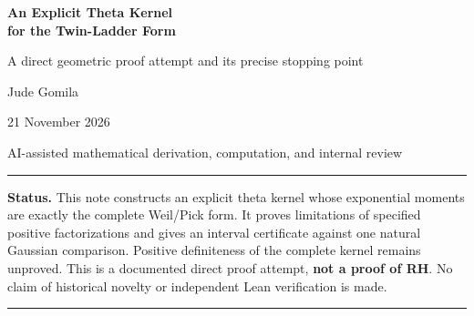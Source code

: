 \documentclass[11pt,letterpaper]{article}
\theoremstyle{remark}\newtheorem{remark}[theorem]{Remark}
\numberwithin{equation}{section}
\begin{document}
\begin{center}
{\LARGE\bfseries An Explicit Theta Kernel\\[0.2em]for the Twin-Ladder Form}\par
\vspace{0.4em}
{\large A direct geometric proof attempt and its precise stopping point}\par
\vspace{0.7em}
Jude Gomila\par
21 November 2026\par
{\small AI-assisted mathematical derivation, computation, and internal review}
\end{center}
\vspace{0.4em}\hrule\vspace{0.4em}
\textbf{Status.} This note constructs an explicit theta kernel whose exponential moments are exactly the complete Weil/Pick form. It proves limitations of specified positive factorizations and gives an interval certificate against one natural Gaussian comparison. Positive definiteness of the complete kernel remains unproved. This is a documented direct proof attempt, \textbf{not a proof of RH}. No claim of historical novelty or independent Lean verification is made.
\vspace{0.4em}\hrule

\begin{abstract}
Starting from the actual Riemann theta kernel, we derive a continuous two-variable kernel with positive entries and an exact transform identity for the twin-ladder Pick form. Gaussian-weighted density shows that positive definiteness of this kernel is equivalent to the project's sparse Pick criterion, hence to RH. We attempt a positive Gaussian boundary factorization. The remainder has a rigorously negative value at the origin for the actual Riemann kernel. More generally, no positive rank-one channel built from a nonzero constant-coefficient polynomial derivative of the theta kernel can be subtracted while retaining positive definiteness; the real-axis growth of the completed logarithmic derivative rules this out. A second construction supplies a positive prime-delay graph energy, together with its unavoidable arithmetic counterterm; the latter is unbounded relative to the ordinary norm even on the sparse test space. An exact strongly log-concave Gaussian-mixture example independently tests the generic geometric assumptions. The unresolved step is a positive factorization outside the excluded class, or a whole-form comparison for the specified arithmetic form.
\end{abstract}
\end{document}

